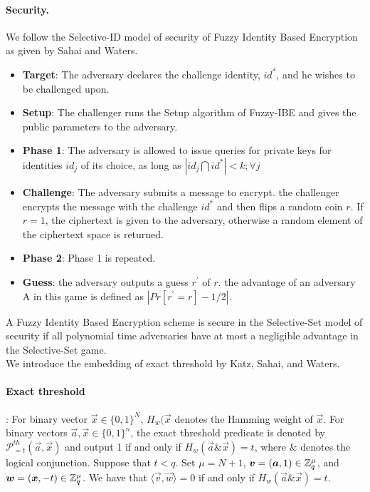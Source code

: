 \paragraph{Security.} We follow the Selective-ID model of security of Fuzzy Identity Based Encryption as given by Sahai and Waters\cite{EC:SahWat05}.
\begin{itemize}
 \item \textbf{Target}: The adversary declares the challenge identity, $id^{*}$, and he wishes to be challenged upon.
 \item \textbf{Setup}: The challenger runs the Setup algorithm of Fuzzy-IBE and gives the public parameters to the adversary.
 \item \textbf{Phase 1}: The adversary is allowed to issue queries for private keys for identities $id_{j}$ of its choice, as long as $|id_{j} \bigcap id^{*}|< k; \forall j$
 \item \textbf{Challenge}: The adversary submits a message to encrypt. the challenger encrypts the message with the challenge $id^{*}$ and then flips a random coin $r$. If $r=1$, the ciphertext is given to the adversary, otherwise a random element of the ciphertext space is returned.
 \item \textbf{Phase 2}: Phase 1 is repeated.
 \item \textbf{Guess}: the adversary outputs a guess $r^{'}$ of $r$. the advantage of an adversary A in this game is defined as $|Pr[r^{'}=r]-1/2|$.
\end{itemize}

A Fuzzy Identity Based Encryption scheme is secure in the Selective-Set model of security if all polynomial time adversaries have at most a negligible advantage in the Selective-Set game.\\[0.4cm]
We introduce the embedding of exact threshold by Katz, Sahai, and Waters\cite{EC:KatSahWat08}.
\paragraph{Exact threshold}: For binary vector $\vec{x} \in \{0,1\}^{N}$, $H_{w}(\vec{x}$ denotes the Hamming weight of $\vec{x}$. For binary vectors $\vec{a}, \vec{x} \in \{0,1\}^{n}$, the exact threshold predicate is denoted by $\mathcal{P}^{th}_{=t}(\vec{a}, \vec{x})$ and output 1 if and only if $H_{w}(\vec{a} \& \vec{x})=t$, where $\&$ denotes the logical conjunction. Suppose that $t<q$. Set $\mu=N+1$, $\boldsymbol{v}=(\boldsymbol{a}, 1) \in \mathbb{Z}^{\mu}_{q}$, and $\boldsymbol{w}=(\boldsymbol{x}, -t) \in \mathbb{Z}^{\mu}_{q}$. We have that $\langle \vec{v}, \vec{w} \rangle =0 $ if and only if $H_{w}(\vec{a} \& \vec{x})=t$.


